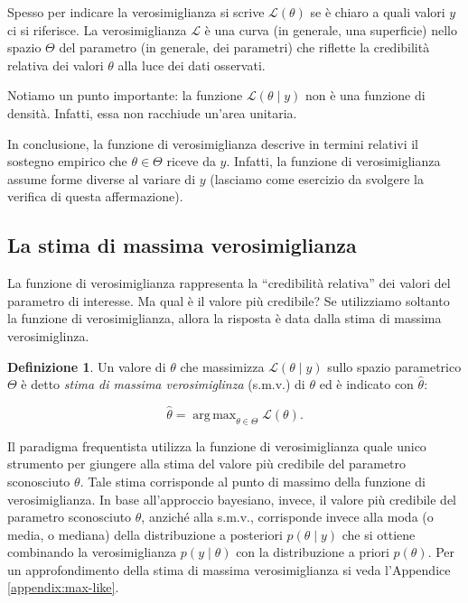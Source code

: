 \documentclass[
  11pt,
]{krantz}
\DeclareMathOperator{\argmax}{arg\,max} %
\theoremstyle{definition}
\newtheorem{definition}{Definizione}[chapter]
\theoremstyle{definition}
\theoremstyle{definition}
\theoremstyle{definition}
\theoremstyle{remark}
\begin{document}
Spesso per indicare la verosimiglianza si scrive \(\mathcal{L}(\theta)\) se è chiaro a quali valori \(y\) ci si riferisce. La verosimiglianza \(\mathcal{L}\) è una curva (in generale, una superficie) nello spazio \(\Theta\) del parametro (in generale, dei parametri) che riflette la credibilità relativa dei valori \(\theta\) alla luce dei dati osservati.

Notiamo un punto importante: la funzione \(\mathcal{L}(\theta \mid y)\) non è una funzione di densità. Infatti, essa non racchiude un'area unitaria.

In conclusione, la funzione di verosimiglianza descrive in termini relativi il sostegno empirico che \(\theta \in \Theta\) riceve da \(y\). Infatti, la funzione di verosimiglianza assume forme diverse al variare di \(y\) (lasciamo come esercizio da svolgere la verifica di questa affermazione).

\hypertarget{la-stima-di-massima-verosimiglianza}{%
\subsection{La stima di massima verosimiglianza}\label{la-stima-di-massima-verosimiglianza}}

La funzione di verosimiglianza rappresenta la ``credibilità relativa'' dei valori del parametro di interesse. Ma qual è il valore più credibile? Se utilizziamo soltanto la funzione di verosimiglianza, allora la risposta è data dalla stima di massima verosimiglinza.

\begin{definition}
Un valore di \(\theta\) che massimizza \(\mathcal{L}(\theta \mid y)\) sullo spazio parametrico \(\Theta\) è detto \emph{stima di massima verosimiglinza} (s.m.v.) di \(\theta\) ed è indicato con \(\hat{\theta}\):

\begin{equation}
\hat{\theta} = \argmax_{\theta \in \Theta} \mathcal{L}(\theta).
\end{equation}
\end{definition}

Il paradigma frequentista utilizza la funzione di verosimiglianza quale unico strumento per giungere alla stima del valore più credibile del parametro sconosciuto \(\theta\). Tale stima corrisponde al punto di massimo della funzione di verosimiglianza. In base all'approccio bayesiano, invece, il valore più credibile del parametro sconosciuto \(\theta\), anziché alla s.m.v., corrisponde invece alla moda (o media, o mediana) della distribuzione a posteriori \(p(\theta \mid y)\) che si ottiene combinando la verosimiglianza \(p(y \mid \theta)\) con la distribuzione a priori \(p(\theta)\). Per un approfondimento della stima di massima verosimiglianza si veda l'Appendice \ref{appendix:max-like}.
\end{document}
